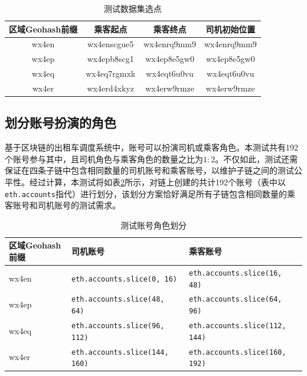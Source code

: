 \begin{table}[htbp]
    \linespread{1.5}
    \centering
    \caption{测试数据集选点}\label{测试数据集选点}
    \begin{tabular}{c|c|c|c} \toprule
        区域Geohash前缀 & 乘客起点        & 乘客终点        & 司机初始位置      \\\hline
        wx4en       & wx4enscgue5 & wx4enrq9mm9 & wx4enrq9mm9 \\
        wx4ep       & wx4epb8scg1 & wx4ep8e5gw0 & wx4ep8e5gw0 \\
        wx4eq       & wx4eq7rgmxk & wx4eqt6u0vu & wx4eqt6u0vu \\
        wx4er       & wx4erd4xkyz & wx4erw9rmze & wx4erw9rmze \\
        \bottomrule
    \end{tabular}
\end{table}

\subsection{划分账号扮演的角色}

基于区块链的出租车调度系统中，账号可以扮演司机或乘客角色。本测试共有192个账号参与其中，且司机角色与乘客角色的数量之比为$1:2$。不仅如此，测试还需保证在四条子链中包含相同数量的司机账号和乘客账号，以维护子链之间的测试公平性。经过计算，本测试将如表\ref{测试账号角色划分}所示，对链上创建的共计192个账号（表中以\verb|eth.accounts|指代）进行划分，该划分方案恰好满足所有子链包含相同数量的乘客账号和司机账号的测试需求。

\begin{table}[htbp]
    \linespread{1.5}
    \centering
    \caption{测试账号角色划分}\label{测试账号角色划分}
    \begin{tabular}{l|l|l} \toprule
        区域Geohash前缀 & 司机账号                                & 乘客账号                                \\\hline
        wx4en       & \verb|eth.accounts.slice(0, 16)|    & \verb|eth.accounts.slice(16, 48)|   \\
        wx4ep       & \verb|eth.accounts.slice(48, 64)|   & \verb|eth.accounts.slice(64, 96)|   \\
        wx4eq       & \verb|eth.accounts.slice(96, 112)|  & \verb|eth.accounts.slice(112, 144)| \\
        wx4er       & \verb|eth.accounts.slice(144, 160)| & \verb|eth.accounts.slice(160, 192)| \\
        \bottomrule
    \end{tabular}
\end{table}


